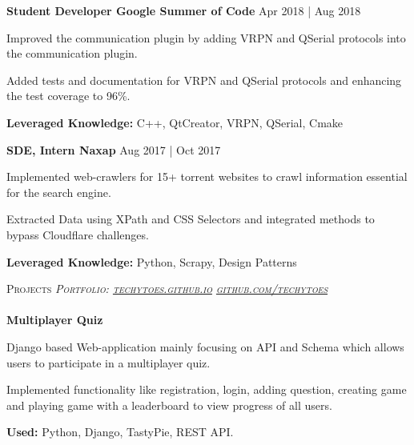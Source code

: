 \documentclass[a4paper]{article}
\newcommand{\lineunder} {
    \vspace*{-8pt} \\
    \hspace*{-18pt} \hrulefill \\
}
\newcommand{\header} [1] {
    {\hspace*{-18pt}\vspace*{6pt} \textsc{#1}}
    \vspace*{-6pt} \lineunder
}
\begin{document}
\textbf{Student Developer  \hfill Google Summer of Code} \hfill Apr 2018 | Aug 2018\\
\vspace{-1mm}
\begin{itemize} \itemsep 1pt
	\small{\item Improved the communication plugin by adding VRPN and QSerial protocols into the communication plugin.}
	\vspace{-1mm}
	\small{\item  Added tests and documentation for VRPN and QSerial protocols and enhancing the test coverage to 96\%.}
	\vspace{-1mm}
	\small{\item \textbf{Leveraged Knowledge:} C++, QtCreator, VRPN, QSerial, Cmake}
\end{itemize}

\textbf{SDE, Intern  \hfill Naxap} \hfill Aug 2017 | Oct 2017\\
\vspace{-1mm}
\begin{itemize} \itemsep 1pt
	\small{\item Implemented web-crawlers for 15+ torrent websites to crawl information essential for the search engine.}
	\small{\item Extracted Data using XPath and CSS Selectors and integrated methods to bypass Cloudflare challenges.}
	\small{\item \textbf{Leveraged Knowledge:} Python, Scrapy, Design Patterns}
\end{itemize}


\header{Projects \hfill \sl \small{Portfolio: \href{http://techytoes.github.io}{techytoes.github.io}} \hfill \faGithub \sl \small{ \href{https://github.com/techytoes}{github.com/techytoes}}}

\textbf{Multiplayer Quiz \href{https://github.com/techytoes/Multiplayer-Quiz}{\faGithub}}
\vspace{-1mm}
\begin{itemize}
	\small{\item Django based Web-application mainly focusing on API and Schema which allows users to participate in a multiplayer quiz.}
	\vspace{-1mm}
	\small{\item Implemented functionality like registration, login, adding question, creating game and playing game with a leaderboard to view progress of all users.}
	\vspace{-1mm}
	\small{\item \textbf{Used:} Python, Django, TastyPie, REST API.}
	\vspace{-1mm}
\end{itemize}
\end{document}
